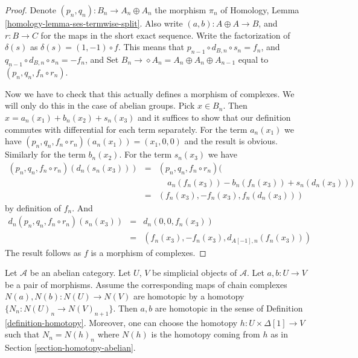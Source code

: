 \begin{proof}
Denote $(p_n, q_n) : B_n \to A_n \oplus A_n$ the morphism $\pi_n$
of Homology, Lemma \ref{homology-lemma-ses-termwise-split}.
Also write $(a, b) : A \oplus A \to B$, and
$r : B \to C$ for the maps in the short exact sequence.
Write the factorization of $\delta(s)$ as
$\delta(s) = (1, -1) \circ f$. This means that
$p_{n - 1} \circ d_{B, n} \circ s_n = f_n$, and
$q_{n - 1} \circ d_{B, n} \circ s_n = - f_n$, and
Set $B_n \to \diamond A_n = A_n \oplus A_n \oplus A_{n - 1}$
equal to $(p_n, q_n, f_n \circ r_n)$.

\medskip\noindent
Now we have to check that this actually defines a morphism
of complexes. We will only do this in the case of abelian groups.
Pick $x \in B_n$. Then $x = a_n(x_1) + b_n(x_2) + s_n(x_3)$
and it suffices to show that our definition commutes
with differential for each term separately. For the term
$a_n(x_1)$ we have $(p_n, q_n, f_n \circ r_n)(a_n(x_1)) =
(x_1, 0, 0)$ and the result is obvious. Similarly for
the term $b_n(x_2)$. For the term $s_n(x_3)$ we have
\begin{eqnarray*}
(p_n, q_n, f_n \circ r_n)(d_n(s_n(x_3))) & = &
(p_n, q_n, f_n \circ r_n)( \\
& & \ \ \ \ \ a_n(f_n(x_3)) - b_n(f_n(x_3)) + s_n(d_n(x_3))) \\
& = &
(f_n(x_3), -f_n(x_3), f_n(d_n(x_3)))
\end{eqnarray*}
by definition of $f_n$. And
\begin{eqnarray*}
d_n(p_n, q_n, f_n \circ r_n)(s_n(x_3)) & = & d_n(0, 0, f_n(x_3)) \\
& = &
(f_n(x_3), - f_n(x_3), d_{A[-1], n}(f_n(x_3)))
\end{eqnarray*}
The result follows as $f$ is a morphism of complexes.
\end{proof}

\begin{lemma}
\label{lemma-backwards-homotopy}
Let $\mathcal{A}$ be an abelian category.
Let $U$, $V$ be simplicial objects of $\mathcal{A}$.
Let $a, b : U \to V$ be a pair of morphisms.
Assume the corresponding maps of chain complexes
$N(a), N(b) : N(U) \to N(V)$ are homotopic by
a homotopy $\{N_n : N(U)_n \to N(V)_{n + 1}\}$.
Then $a, b$ are homotopic in the sense of
Definition \ref{definition-homotopy}. Moreover, one can choose the
homotopy $h : U \times \Delta[1] \to V$ such that
$N_n = N(h)_n$ where $N(h)$ is the homotopy coming
from $h$ as in Section \ref{section-homotopy-abelian}.
\end{lemma}

